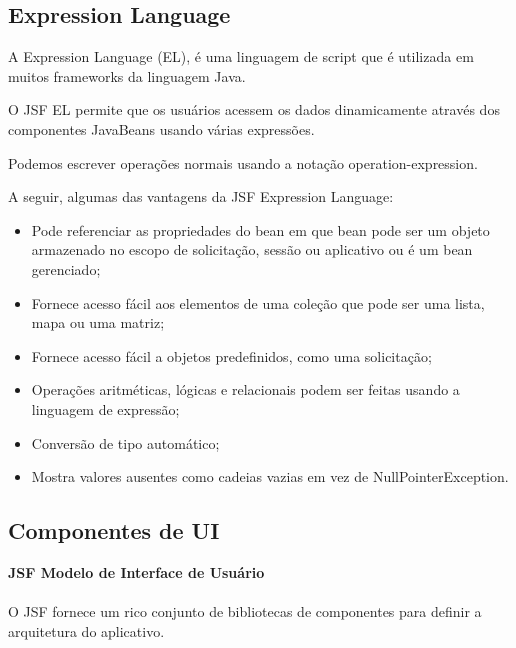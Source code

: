 \documentclass[	DIV=calc,%
							paper=a4,%
							fontsize=12pt,%
							onecolumn]{scrartcl}	 					%
\begin{document}
\subsection{Expression Language}

A Expression Language (EL), é uma linguagem de script que é utilizada em muitos frameworks da linguagem Java.

O JSF EL permite que os usuários acessem os dados dinamicamente através dos componentes JavaBeans usando várias expressões.

Podemos escrever operações normais usando a notação operation-expression.

A seguir, algumas das vantagens da JSF Expression Language:
\begin{itemize}
\item Pode referenciar as propriedades do bean em que bean pode ser um objeto armazenado no escopo de solicitação, sessão ou aplicativo ou é um bean gerenciado;
\item Fornece acesso fácil aos elementos de uma coleção que pode ser uma lista, mapa ou uma matriz;
\item Fornece acesso fácil a objetos predefinidos, como uma solicitação;
\item Operações aritméticas, lógicas e relacionais podem ser feitas usando a linguagem de expressão;
\item Conversão de tipo automático;
\item Mostra valores ausentes como cadeias vazias em vez de NullPointerException.
\end{itemize}


\subsection{Componentes de UI}

\textbf{JSF Modelo de Interface de Usuário}
\\~\\
O JSF fornece um rico conjunto de bibliotecas de componentes para definir a arquitetura do aplicativo.
\end{document}
